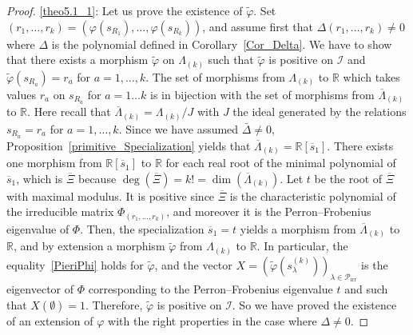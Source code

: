 \documentclass[ALCO,ThmDefs,Unicode,epreuves]{cedram}
\DeclareMathOperator{\irr}{irr}
\begin{document}
\begin{proof}
\eqref{theo5.1_1}: Let us prove the existence of $\tilde{\varphi}$. Set $(r_{1},\ldots,
r_{k})=(\varphi(s_{R_{1}}),\ldots,\varphi(s_{R_{k}}))$, and assume first that
$\Delta(r_{1},\ldots,r_{k})\not =0$ where $\Delta$ is the polynomial defined
in Corollary~\ref{Cor_Delta}. We have to show that there exists a morphism
$\widetilde{\varphi}$ on $\Lambda_{(k)}$ such that $\widetilde{\varphi}$ is
positive on $\mathcal{I}$ and $\widetilde{\varphi}(s_{R_{a}})=r_{a}$ for
$a=1,\ldots,k$. The set of morphisms from $\Lambda_{(k)}$ to $\mathbb{R}$
which takes values $r_{a}$ on $s_{R_{a}}$ for $a=1\ldots k$ is in bijection
with the set of morphisms from $\overline{\Lambda}_{(k)}$ to $\mathbb{R}.$
Here recall that $\overline{\Lambda}_{(k)}=\Lambda_{(k)}/J$ with $J$ the ideal
generated by the relations $s_{R_{a}}=r_{a}$ for $a=1,\ldots,k$. Since we have
assumed $\bar{\Delta}\not =0$, Proposition~\ref{primitive_Specialization}
yields that $\overline{\Lambda}_{(k)}=\mathbb{R}[\overline{s}_{1}]$. There
exists one morphism from $\mathbb{R}[\overline{s}_{1}]$ to $\mathbb{R}$ for
each real root of the minimal polynomial of $\overline{s}_{1}$, which is
$\overline{\Xi}$ because $\deg(\overline{\Xi})=k!=\dim(\overline{\Lambda
}_{(k)})$. Let $t$ be the root of $\overline{\Xi}$ with maximal modulus. It is
positive since $\overline{\Xi}$ is the characteristic polynomial of the
irreducible matrix $\Phi_{(r_{1},\ldots,r_{k})}$, and moreover it is the
Perron--Frobenius eigenvalue of $\Phi$. Then, the specialization $\overline
{s}_{1}=t$ yields a morphism from $\overline{\Lambda}_{(k)}$ to $\mathbb{R}$,
and by extension a morphism $\widetilde{\varphi}$ from $\Lambda_{(k)}$ to
$\mathbb{R}$. In particular, the equality~\eqref{PieriPhi} holds for
$\widetilde{\varphi}$, and the vector $X=(\widetilde{\varphi}(s_{\lambda
}^{(k)}))_{\lambda\in\mathcal{P}_{\irr }}$ is the eigenvector of $\Phi$
corresponding to the Perron--Frobenius eigenvalue $t$ and such that
$X(\emptyset)=1$. Therefore, $\widetilde{\varphi}$ is positive on
$\mathcal{I}$. So we have proved the existence of an extension of $\varphi$
with the right properties in the case where $\Delta\neq0$.


\end{proof}
\end{document}
